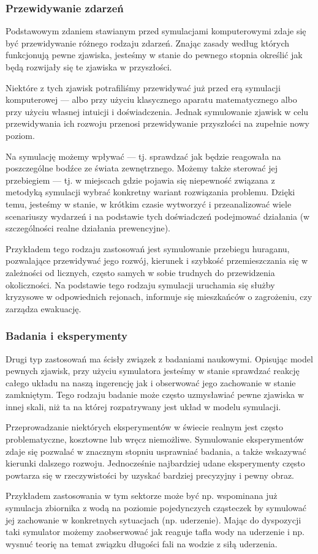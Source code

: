\subsubsection{Przewidywanie zdarzeń}
\par{
Podstawowym zdaniem stawianym przed symulacjami komputerowymi zdaje się być przewidywanie różnego rodzaju zdarzeń. Znając zasady według których funkcjonują pewne zjawiska, jesteśmy w stanie do pewnego stopnia określić jak będą rozwijały się te zjawiska w przyszłości.
}
\par{
Niektóre z tych zjawisk potrafiliśmy przewidywać już przed erą symulacji komputerowej --- albo przy użyciu klasycznego aparatu matematycznego albo przy użyciu własnej intuicji i doświadczenia. Jednak symulowanie zjawisk w celu przewidywania ich rozwoju przenosi przewidywanie przyszłości na zupełnie nowy poziom.
}
\par{
Na symulację możemy wpływać --- tj. sprawdzać jak będzie reagowała na poszczególne bodźce ze świata zewnętrznego. Możemy także sterować jej przebiegiem --- tj. w miejscach gdzie pojawia się niepewność związana z metodyką symulacji wybrać konkretny wariant rozwiązania problemu.
Dzięki temu, jesteśmy w stanie, w krótkim czasie wytworzyć i przeanalizować wiele scenariuszy wydarzeń i na podstawie tych doświadczeń podejmować działania (w szczególności realne działania prewencyjne).
}
\par{
Przykładem tego rodzaju zastosowań jest symulowanie przebiegu huraganu, pozwalające przewidywać jego rozwój, kierunek i szybkość przemieszczania się w zależności od licznych, często samych w sobie trudnych do przewidzenia okoliczności. Na podstawie tego rodzaju symulacji uruchamia się służby kryzysowe w odpowiednich rejonach, informuje się mieszkańców o zagrożeniu, czy zarządza ewakuację.
}

\subsubsection{Badania i eksperymenty}
\par{
Drugi typ zastosowań ma ścisły związek z badaniami naukowymi.
Opisując model pewnych zjawisk, przy użyciu symulatora jesteśmy w stanie sprawdzać reakcję całego układu na naszą ingerencję jak i obserwować jego zachowanie w stanie zamkniętym. Tego rodzaju badanie może często uzmysławiać pewne zjawiska w innej skali, niż ta na której rozpatrywany jest układ w modelu symulacji.
}
\par{
Przeprowadzanie niektórych eksperymentów w świecie realnym jest często problematyczne, kosztowne lub wręcz niemożliwe. Symulowanie eksperymentów zdaje się pozwalać w znacznym stopniu usprawniać badania, a także wskazywać kierunki dalszego rozwoju. Jednocześnie najbardziej udane eksperymenty często powtarza się w rzeczywistości by uzyskać bardziej precyzyjny i pewny obraz.
}
\par{
Przykładem zastosowania w tym sektorze może być np. wspominana już symulacja zbiornika z wodą na poziomie pojedynczych cząsteczek by symulować jej zachowanie w konkretnych sytuacjach (np. uderzenie). Mając do dyspozycji taki symulator możemy zaobserwować jak reaguje tafla wody na uderzenie i np. wysnuć teorię na temat związku długości fali na wodzie z siłą uderzenia.
}

